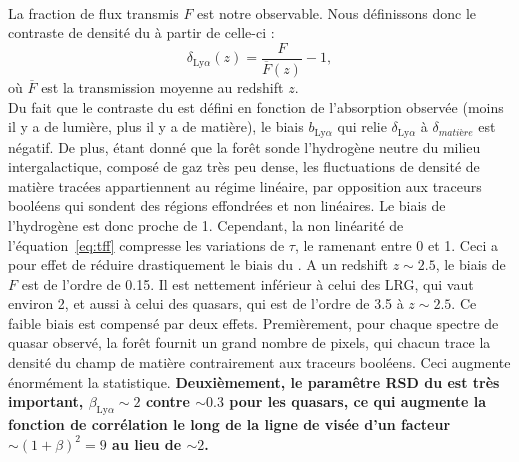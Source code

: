 \documentclass[11pt, twoside, a4paper, openright]{report}
\begin{document}
\paragraph{}
La fraction de flux transmis $F$ est notre observable. Nous définissons donc le contraste de densité du \lya{} à partir de celle-ci : 
\begin{equation}
  \label{eq:delta_lya}
  \delta_{\mathrm{Ly}\alpha}(z) = \frac{F}{\overline F(z)} - 1 , 
\end{equation}
où $\overline F$ est la transmission moyenne au redshift $z$.\\
Du fait que le contraste du \lya{} est défini en fonction de l'absorption observée (moins il y a de lumière, plus il y a de matière), le biais $b_{\mathrm{Ly}\alpha}$ qui relie $\delta_{\mathrm{Ly}\alpha}$ à $\delta_{matière}$ est négatif.
De plus, étant donné que la forêt \lya{} sonde l'hydrogène neutre du milieu intergalactique, composé de gaz très peu dense, les fluctuations de densité de matière tracées appartiennent au régime linéaire, par opposition aux traceurs booléens qui sondent des régions effondrées et non linéaires. Le biais de l'hydrogène est donc proche de 1. Cependant, la non linéarité de l'équation~\ref{eq:tff} compresse les variations de $\tau$, le ramenant entre 0 et 1. Ceci a pour effet de réduire drastiquement le biais du \lya{}. A un redshift $z \sim \num{2.5}$, le biais de $F$ est de l'ordre de \num{0.15}. Il est nettement inférieur à celui des LRG, qui vaut environ 2, et aussi à celui des quasars, qui est de l'ordre de \num{3.5} à $z \sim \num{2.5}$.
Ce faible biais est compensé par deux effets.
Premièrement, pour chaque spectre de quasar observé, la forêt \lya{} fournit un grand nombre de pixels, qui chacun trace la densité du champ de matière contrairement aux traceurs booléens. Ceci augmente énormément la statistique.
\textbf{Deuxièmement, le paramêtre RSD du \lya{} est très important, $\beta_{\mathrm{Ly}\alpha} \sim 2$ contre $\sim \num{0.3}$ pour les quasars, ce qui augmente  la fonction de corrélation le long de la ligne de visée d'un facteur $\sim (1+\beta)^2 = 9$ au lieu de $\sim 2$.}
\end{document}
